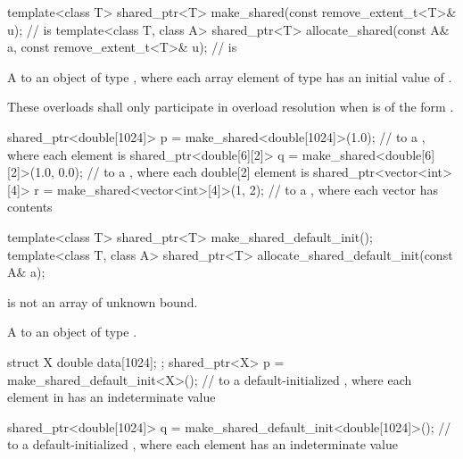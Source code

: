 %
%
\begin{itemdecl}
template<class T>
  shared_ptr<T> make_shared(const remove_extent_t<T>& u);       //  is 
template<class T, class A>
  shared_ptr<T> allocate_shared(const A& a,
                                const remove_extent_t<T>& u);   //  is 
\end{itemdecl}

\begin{itemdescr}
\pnum
\returns
A  to an object of type ,
where each array element of type 
has an initial value of .

\pnum
\remarks
These overloads shall only participate in overload resolution
when  is of the form .

\pnum
\begin{example}
\begin{codeblock}
shared_ptr<double[1024]> p = make_shared<double[1024]>(1.0);
  //  to a , where each element is 
shared_ptr<double[6][2]> q = make_shared<double[6][2]>({1.0, 0.0});
  //  to a , where each double[2] element is 
shared_ptr<vector<int>[4]> r = make_shared<vector<int>[4]>({1, 2});
  //  to a , where each vector has contents 
\end{codeblock}
\end{example}
\end{itemdescr}

%
%
\begin{itemdecl}
template<class T>
  shared_ptr<T> make_shared_default_init();
template<class T, class A>
  shared_ptr<T> allocate_shared_default_init(const A& a);
\end{itemdecl}

\begin{itemdescr}
\pnum
\constraints
{} is not an array of unknown bound.

\pnum
\returns
A  to an object of type .

\pnum
\begin{example}
\begin{codeblock}
struct X { double data[1024]; };
shared_ptr<X> p = make_shared_default_init<X>();
  //  to a default-initialized , where each element in  has an indeterminate value

shared_ptr<double[1024]> q = make_shared_default_init<double[1024]>();
  //  to a default-initialized , where each element has an indeterminate value
\end{codeblock}
\end{example}
\end{itemdescr}

